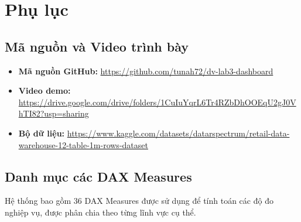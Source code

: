 \section{Phụ lục}

\subsection{Mã nguồn và Video trình bày}

\begin{itemize}
    \item \textbf{Mã nguồn GitHub:} \url{https://github.com/tunah72/dv-lab3-dashboard}
    \item \textbf{Video demo:} \url{https://drive.google.com/drive/folders/1CuIuYqrL6Tr4RZbDhOOEqU2gJ0VhTI82?usp=sharing}
    \item \textbf{Bộ dữ liệu:} \url{https://www.kaggle.com/datasets/datarspectrum/retail-data-warehouse-12-table-1m-rows-dataset}
\end{itemize}

\subsection{Danh mục các DAX Measures}

Hệ thống bao gồm 36 DAX Measures được sử dụng để tính toán các độ đo nghiệp vụ, được phân chia theo từng lĩnh vực cụ thể.

